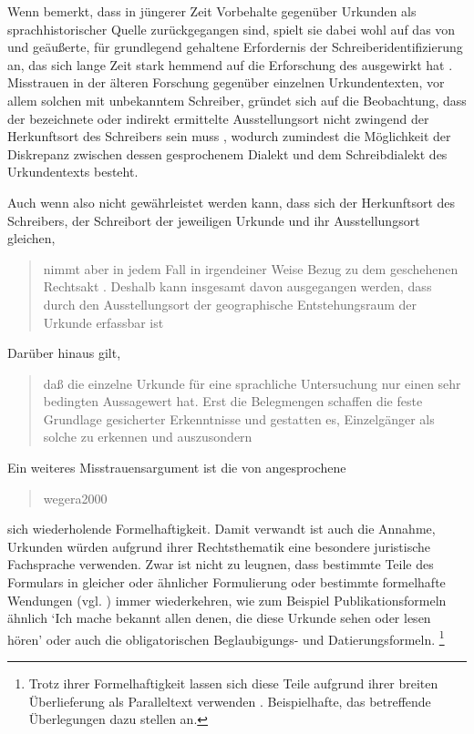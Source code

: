 Wenn \citeauthor{schulze2011} bemerkt, dass in jüngerer Zeit Vorbehalte
gegenüber Urkunden als sprachhistorischer Quelle zurückgegangen sind, spielt
sie dabei wohl auf das von \citet[23--33]{boesch1946} und
\citet[389]{haacke1955} geäußerte, für grundlegend gehaltene Erfordernis der
Schrei\-ber\-identifizierung an, das sich lange Zeit stark hemmend auf die
Erforschung des \CAO{} ausgewirkt hat \autocite[21--22]{schulze2011}.
Misstrauen in der älteren Forschung gegenüber einzelnen Urkunden\-texten, vor
allem solchen mit unbekanntem Schreiber, gründet sich auf die Beobachtung, dass
der bezeichnete oder indirekt ermittelte Ausstellungsort nicht zwingend der
Herkunftsort des Schreibers sein muss
\autocite[16]{schulze2011}, wodurch zumindest die Möglichkeit der Diskrepanz
zwischen dessen gesprochenem Dialekt und dem Schreibdialekt des Urkundentexts
besteht.

Auch wenn also nicht gewährleistet werden kann, dass sich der Herkunftsort des
Schreibers, der Schreibort der jeweiligen Urkunde und ihr Ausstellungsort
gleichen, \blockcquote[331--332]{ganslmayeretal2003}{nimmt  aber in jedem Fall in irgendeiner Weise Bezug zu dem
geschehenen Rechtsakt \textelp{}. Deshalb kann insgesamt davon ausgegangen
werden, dass durch den Ausstellungsort der geographische Entstehungsraum der
Urkunde erfassbar ist}.
Darüber hinaus gilt, \blockcquote[122]{deboor1974}{daß die einzelne Urkunde für
eine sprachliche Untersuchung nur einen sehr bedingten Aussagewert hat. Erst
die Belegmengen schaffen die feste Grundlage gesicherter Erkenntnisse und
gestatten es, Einzelgänger als solche zu erkennen und auszusondern}.

Ein weiteres Misstrauensargument ist die von \citet[1311]{wegera2000}
angesprochene \blockquote{wegera2000}{sich wiederholende Formelhaftigkeit}.
Damit verwandt ist auch die Annahme, Urkunden würden aufgrund ihrer
Rechtsthematik eine besondere juristische Fachsprache verwenden. Zwar ist nicht
zu leugnen, dass bestimmte Teile des Formulars in gleicher oder ähnlicher
Formulierung oder bestimmte formelhafte Wendungen (vgl.
) immer wiederkehren, wie zum Beispiel
Publikationsformeln ähnlich  `Ich mache bekannt allen denen, die diese Urkunde sehen
oder lesen hören' oder auch die obligatorischen Beglaubigungs- und
Datierungsformeln.%
%
	\footnote{%
	Trotz ihrer Formelhaftigkeit lassen sich diese Teile aufgrund ihrer breiten
	Überlieferung als Paralleltext verwenden
	\autocite[siehe][]{cysouwwaelchli2007}. Beispielhafte, das \CAO{}
	betreffende Überlegungen dazu stellen
	\citet[174--175]{beckerschallert2022b} an.}

